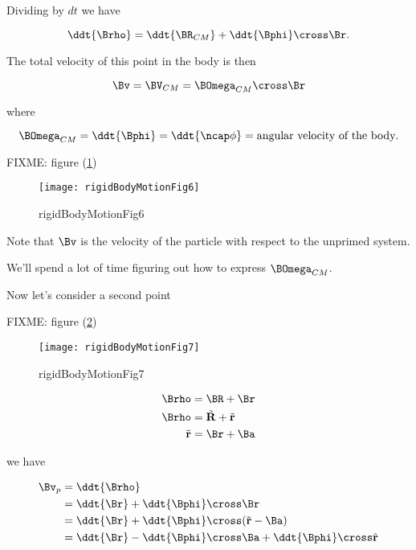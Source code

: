 Dividing by $dt$ we have

\begin{equation}\label{eqn:rigidBodyMotion:160}
\ddt{\Brho} = \ddt{\BR_{CM}} + \ddt{\Bphi} \cross \Br.
\end{equation}

The total velocity of this point in the body is then

\begin{equation}\label{eqn:rigidBodyMotion:180}
\Bv = \BV_{CM} = \BOmega_{CM} \cross \Br
\end{equation}

where

\begin{equation}\label{eqn:rigidBodyMotion:200}
\BOmega_{CM} = \ddt{\Bphi} = \ddt{\ncap \phi} = \text{angular velocity of the body}.
\end{equation}

FIXME: figure (\ref{fig:rigidBodyMotion:rigidBodyMotionFig6})
\begin{figure}[htp]
   \centering
   \texttt{[image: rigidBodyMotionFig6]}
   \caption{rigidBodyMotionFig6}\label{fig:rigidBodyMotion:rigidBodyMotionFig6}
\end{figure}

Note that $\Bv$ is the velocity of the particle with respect to the unprimed system.

We'll spend a lot of time figuring out how to express $\BOmega_{CM}$.

Now let's consider a second point

FIXME: figure (\ref{fig:rigidBodyMotion:rigidBodyMotionFig7})
\begin{figure}[htp]
   \centering
   \texttt{[image: rigidBodyMotionFig7]}
   \caption{rigidBodyMotionFig7}\label{fig:rigidBodyMotion:rigidBodyMotionFig7}
\end{figure}

\begin{align}\label{eqn:rigidBodyMotion:220}
\Brho &= \BR + \Br \\
\Brho &= \tilde{\mathbf{R}} + \tilde{\mathbf{r}} \\
\tilde{\mathbf{r}} &= \Br + \Ba
\end{align}

we have

\begin{align*}
\Bv_p
&=
\ddt{\Brho} \\
&= \ddt{\Br} + \ddt{\Bphi} \cross \Br \\
&= \ddt{\Br} + \ddt{\Bphi} \cross (\tilde{\mathbf{r}} - \Ba) \\
&= \ddt{\Br} - \ddt{\Bphi} \cross \Ba + \ddt{\Bphi} \cross \tilde{\mathbf{r}} 
\end{align*}

